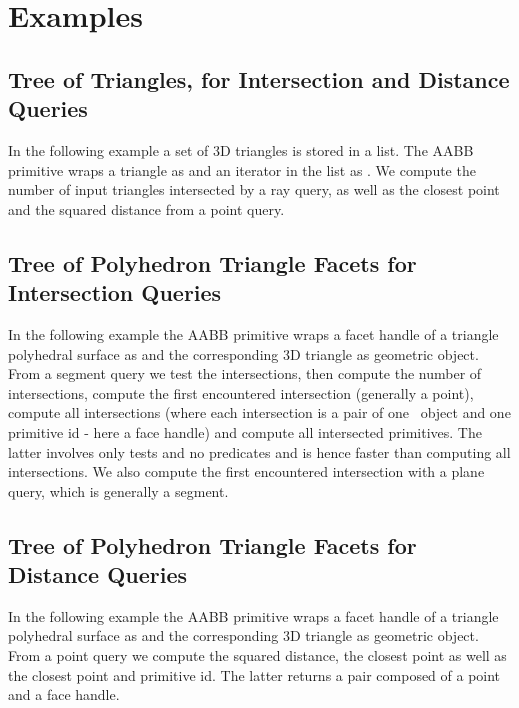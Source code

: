 \section{Examples}
\label{AABB_tree_section_examples}

\subsection{Tree of Triangles, for Intersection and Distance Queries}
In the following example a set of 3D triangles is stored in a list. The AABB primitive wraps a triangle as  and an iterator in the list as . We compute the number of input triangles intersected by a ray query, as well as the closest point and the squared distance from a point query.  

\subsection{Tree of Polyhedron Triangle Facets for Intersection Queries}
In the following example the AABB primitive wraps a facet handle of a triangle polyhedral surface as  and the corresponding 3D triangle as geometric object. From a segment query we test the intersections, then compute the number of intersections, compute the first encountered intersection (generally a point), compute all intersections (where each intersection is a pair of one \cgal\ object and one primitive id - here a face handle) and compute all intersected primitives. The latter involves only tests and no predicates and is hence faster than computing all intersections. We also compute the first encountered intersection with a plane query, which is generally a segment.

\subsection{Tree of Polyhedron Triangle Facets for Distance Queries}
In the following example the AABB primitive wraps a facet handle of a triangle polyhedral surface as  and the corresponding 3D triangle as geometric object. From a point query we compute the squared distance, the closest point as well as the closest point and primitive id. The latter returns a pair composed of a point and a face handle. 

